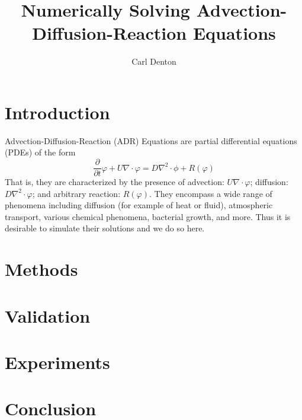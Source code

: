 \documentclass[12pt]{article}
\begin{document}
\title{Numerically Solving Advection-Diffusion-Reaction Equations}
\author{Carl Denton}
\maketitle

\section{Introduction}

Advection-Diffusion-Reaction (ADR) Equations are partial differential equations (PDEs) of the form
\[\frac{\partial}{\partial t} \varphi + U\nabla \cdot \varphi = D\nabla^2\cdot\phi + R(\varphi)\]
That is, they are characterized by the presence of advection: $U\nabla \cdot \varphi$; diffusion: $D\nabla^2 \cdot \varphi$; and arbitrary reaction: $R(\varphi)$.
They encompass a wide range of phenomena including diffusion (for example of heat or fluid), atmospheric transport, various chemical phenomena, bacterial growth, and more. 
Thus it is desirable to simulate their solutions and we do so here.

\section{Methods}


\section{Validation}

\section{Experiments}

\section{Conclusion}
\end{document}
